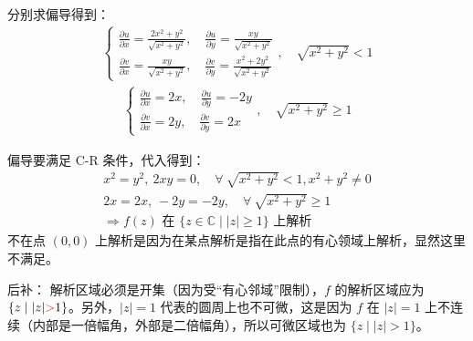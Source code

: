 \documentclass[UTF8]{report}
\def\C{\mathbb{C}}
\theoremstyle{MyLineTheoremStyle} %
\theoremstyle{MyBlockTheoremStyle} %
\theoremstyle{MySubsubsectionStyle} %
\begin{document}
\begin{enumerate}
分别求偏导得到：
\begin{gather}
    \begin{cases}
        \frac{\partial u }{\partial x } = \frac{2x^2 + y^2}{\sqrt{x^2 + y^2}}
        ,\quad \frac{\partial u }{\partial y } = \frac{xy}{\sqrt{x^2 + y^2}} \\
        \frac{\partial v }{\partial x } = \frac{xy}{\sqrt{x^2 + y^2}}
        ,\quad \frac{\partial v }{\partial y } = \frac{x^2 + 2y^2}{\sqrt{x^2 + y^2}}
    \end{cases},\quad \sqrt{x^2+y^2} < 1  
\end{gather}
\begin{gather*}
\begin{cases}
    \frac{\partial u }{\partial x } = 2x
    ,\quad 
    \frac{\partial u }{\partial y } = -2y \\
\frac{\partial v }{\partial x } = 2y
,\quad \frac{\partial v }{\partial y } = 2x
\end{cases}
,\quad \sqrt{x^2+y^2} \geqslant 1
\end{gather*}

偏导要满足 C-R 条件，代入得到：
\begin{gather*}
x^2 = y^2,\  2xy = 0, \quad \forall\  \sqrt{x^2+y^2} < 1, x^2 + y^2 \ne 0  \\
2x = 2x,\ -2y = -2y, \quad \forall\ \sqrt{x^2+y^2} \geqslant 1 \\ 
\Longrightarrow \text{$f(z)$ 在 $\{ z\in \C \mid |z| \geqslant 1 \}$ 上解析}
\end{gather*}
不在点 $(0,0)$ 上解析是因为在某点解析是指在此点的有心领域上解析，显然这里不满足。

{\par\color{gray}\small
后补：{\color{red} 解析区域必须是开集}（因为受“有心邻域”限制），$f$ 的解析区域应为 $\{ z\mid | z | {\color{red} >} 1 \}$。另外，$| z | = 1$ 代表的圆周上也不可微，这是因为 $f$ 在 $| z | =1$ 上不连续（内部是一倍幅角，外部是二倍幅角），所以可微区域也为 $\{z \mid | z | >1\}$。
\par}


\end{enumerate}
\end{document}

